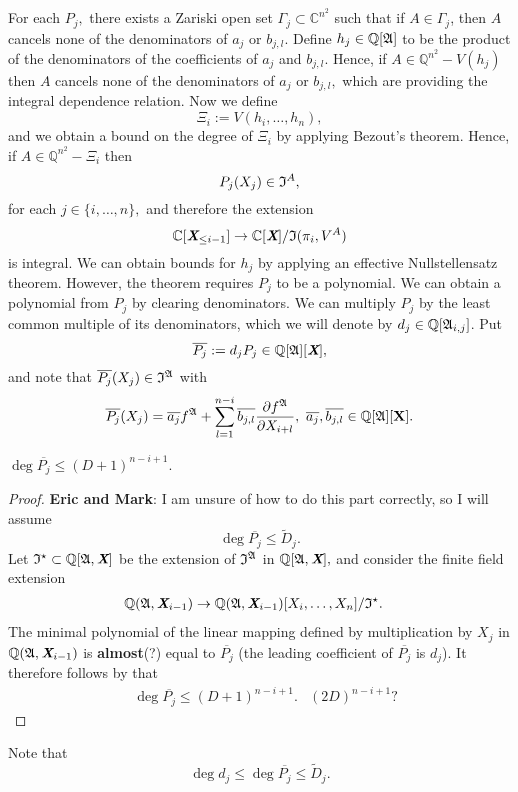 \documentclass[sigconf]{acmart}
\def\Xb{\textit{\textbf{X}}}
\def\ajb{\overline{a_j}}
\def\bjb{\overline{b_{j,l}}}
\def\pjb{\overline{P_{j}}}
\def\C{\mathbb{C}}
\def\Q{\mathbb{Q}}
\def\Dt{\widetilde{D}}
\def\I{\frak{I}}
\def\Is{\frak{I}^{\star}}
\def\A{\frak{A}}
\begin{document}
For each $P_j,$ there exists a Zariski open set $\Gamma_j \subset \C^{n^2}$ such that if $A \in \Gamma_j$,
then $A$ cancels none of the denominators of $a_{j}$ or $b_{j,l}$. Define $h_j \in \Q[\A]$ to be the product of the denominators of the coefficients of $a_j$ and $b_{j,l}$. Hence, if $A \in \Q^{n^2}-V(h_j)$ then $A$ cancels none of the denominators of $a_{j}$ or $b_{j,l},$ which are providing the integral dependence relation. Now we define 
\[
\Xi_i := V(h_i,\hdots,h_n), 
\]
and we obtain a bound on the degree of $\Xi_i$ by applying Bezout's theorem. Hence, if $A\in \Q^{n^2}-\Xi_i$ then
\[
P_j(X_j) \in \I^A,  
\]
for each $j \in \{i,\hdots,n\},$ and therefore the extension 
\[
\mathbb{C}[{\Xb}_{\leq i-1}]\rightarrow\mathbb{C}[\Xb]/\I(\pi_i,V^{A})
\]
is integral. We can obtain bounds for $h_j$ by applying an effective Nullstellensatz theorem. However, the theorem requires $P_{j}$ to be a polynomial. We can obtain a polynomial from $P_{j}$ by clearing denominators. We can multiply $P_{j}$ by the least common multiple of its denominators, which we will denote by $d_j \in \Q[\A_{i,j}]$. Put 
\[
\overline{P_{j}} := d_jP_{j}\in \Q[\A][\textit{\textbf{X}}],
\]
and note that $\pjb(X_j) \in \I^{\A}$ with 
\[
\pjb(X_j) = \ajb f^{\A} + \sum_{l=1}^{n-i}\bjb \frac{\partial f^\A}{\partial X_{i+l}}, ~\ajb,\bjb \in \mathbb{Q}[\A][\textbf{X}].
\]
%
\begin{proposition} 
$\deg \pjb\leq (D+1)^{n-i+1}.$ 
\end{proposition} 
%
\begin{proof}
\textbf{Eric and Mark}: I am unsure of how to do this part correctly, so I will assume 
\[
\deg \pjb\leq \Dt_j.
\]
Let $\Is \subset \Q[\A,\Xb]$ be the extension of $\I^{\A}$ in  $\Q[\A,\Xb],$ and consider the finite field extension
%
\begin{align*}
    \Q(\A,\Xb_{i-1}) &\rightarrow \Q(\A,\Xb_{i-1})[X_i,\hdots,X_n]/\Is.
\end{align*}
%
The minimal polynomial of the linear mapping defined by multiplication by $X_j$ in $\Q(\A,\Xb_{i-1})$ is \textbf{almost}(?) equal to $\pjb$ (the leading coefficient of $\pjb$ is $d_j$). It therefore follows by \cite[Proposition 1]{CGR} that
%
\begin{align*}
&\deg \pjb \leq (D+1)^{n-i+1}.&(2D)^{n-i+1}\textrm{?} 
\end{align*}
%
\end{proof}
%
Note that 
\[
\deg d_j \leq \deg \pjb \leq \Dt_j.
\]
%
\end{document}
